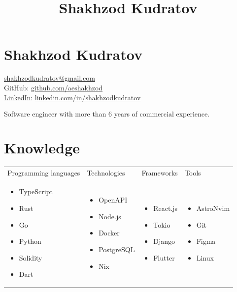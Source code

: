 \documentclass[a4paper,10pt]{article}
\title{Shakhzod Kudratov}
\begin{document}
\section*{Shakhzod Kudratov}

\href{mailto:shakhzodkudratov@gmail.com}{shakhzodkudratov@gmail.com} \\
GitHub: \href{https://github.com/aeshakhzod/}{github.com/aeshakhzod} \\
LinkedIn: \href{https://linkedin.com/in/shakhzodkudratov/}{linkedin.com/in/shakhzodkudratov}

\bigskip
Software engineer with more than 6 years of commercial experience.

\section*{Knowledge}

\begin{tabularx}{\textwidth}{X X X X}

  Programming languages & Technologies & Frameworks & Tools \\
  \vspace{-5mm}\begin{itemize}[leftmargin=*] \setlength{\itemsep}{1pt} \setlength{\parskip}{1pt}
    \item TypeScript
    \item Rust
    \item Go
    \item Python
    \item Solidity
    \item Dart
  \end{itemize}&
  \vspace{-5mm}\begin{itemize}[leftmargin=*] \setlength{\itemsep}{1pt} \setlength{\parskip}{1pt}
    \item OpenAPI
    \item Node.js
    \item Docker
    \item PostgreSQL
    \item Nix
  \end{itemize}&
  \vspace{-5mm}\begin{itemize}[leftmargin=*] \setlength{\itemsep}{1pt} \setlength{\parskip}{1pt}
    \item React.js
    \item Tokio
    \item Django
    \item Flutter
  \end{itemize} &
  \vspace{-5mm}\begin{itemize}[leftmargin=*] \setlength{\itemsep}{1pt} \setlength{\parskip}{1pt}
    \item AstroNvim
    \item Git
    \item Figma
    \item Linux
  \end{itemize}

\end{tabularx}
\end{document}
